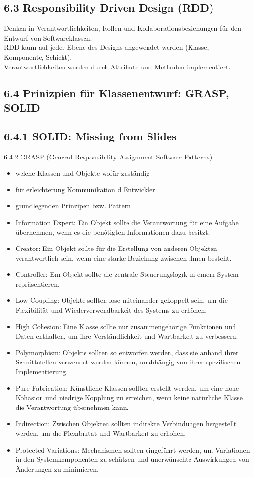 \documentclass[10pt]{article}
\begin{document}
\subsection*{6.3 Responsibility Driven Design (RDD)}
Denken in Verantwortlichkeiten, Rollen und Kollaborationsbeziehungen für den Entwurf von Softwareklassen.\\
RDD kann auf jeder Ebene des Designs angewendet werden (Klasse, Komponente, Schicht).\\
Verantwortlichkeiten werden durch Attribute und Methoden implementiert.

\subsection*{6.4 Prinizpien für Klassenentwurf: GRASP, SOLID}
\subsection*{6.4.1 SOLID: Missing from Slides}
6.4.2 GRASP (General Responsibility Assignment Software Patterns)

\begin{itemize}
  \item welche Klassen und Objekte wofür zuständig
  \item für erleichterung Kommunikation d Entwickler
  \item grundlegenden Prinzipen bzw. Pattern
  \item Information Expert: Ein Objekt sollte die Verantwortung für eine Aufgabe übernehmen, wenn es die benötigten Informationen dazu besitzt.
  \item Creator: Ein Objekt sollte für die Erstellung von anderen Objekten verantwortlich sein, wenn eine starke Beziehung zwischen ihnen besteht.
  \item Controller: Ein Objekt sollte die zentrale Steuerungslogik in einem System repräsentieren.
  \item Low Coupling: Objekte sollten lose miteinander gekoppelt sein, um die Flexibilität und Wiederverwendbarkeit des Systems zu erhöhen.
  \item High Cohesion: Eine Klasse sollte nur zusammengehörige Funktionen und Daten enthalten, um ihre Verständlichkeit und Wartbarkeit zu verbessern.
  \item Polymorphism: Objekte sollten so entworfen werden, dass sie anhand ihrer Schnittstellen verwendet werden können, unabhängig von ihrer spezifischen Implementierung.
  \item Pure Fabrication: Künstliche Klassen sollten erstellt werden, um eine hohe Kohäsion und niedrige Kopplung zu erreichen, wenn keine natürliche Klasse die Verantwortung übernehmen kann.
  \item Indirection: Zwischen Objekten sollten indirekte Verbindungen hergestellt werden, um die Flexibilität und Wartbarkeit zu erhöhen.
  \item Protected Variations: Mechanismen sollten eingeführt werden, um Variationen in den Systemkomponenten zu schützen und unerwünschte Auswirkungen von Änderungen zu minimieren.
\end{itemize}
\end{document}

